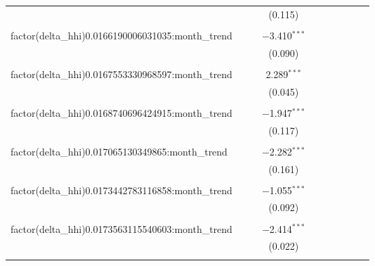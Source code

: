 \begin{table}[H]
{\begin{tabular}{@{\extracolsep{5pt}}lccccccccc}
   &  &  & (0.115) &  &  &  &  &  &  \\  

   & & & & & & & & & \\  

  factor(delta\_hhi)0.0166190006031035:month\_trend &  &  & $-$3.410$^{***}$ &  &  &  &  &  &  \\  

   &  &  & (0.090) &  &  &  &  &  &  \\  

   & & & & & & & & & \\  

  factor(delta\_hhi)0.0167553330968597:month\_trend &  &  & 2.289$^{***}$ &  &  &  &  &  &  \\  

   &  &  & (0.045) &  &  &  &  &  &  \\  

   & & & & & & & & & \\  

  factor(delta\_hhi)0.0168740696424915:month\_trend &  &  & $-$1.947$^{***}$ &  &  &  &  &  &  \\  

   &  &  & (0.117) &  &  &  &  &  &  \\  

   & & & & & & & & & \\  

  factor(delta\_hhi)0.017065130349865:month\_trend &  &  & $-$2.282$^{***}$ &  &  &  &  &  &  \\  

   &  &  & (0.161) &  &  &  &  &  &  \\  

   & & & & & & & & & \\  

  factor(delta\_hhi)0.0173442783116858:month\_trend &  &  & $-$1.055$^{***}$ &  &  &  &  &  &  \\  

   &  &  & (0.092) &  &  &  &  &  &  \\  

   & & & & & & & & & \\  

  factor(delta\_hhi)0.0173563115540603:month\_trend &  &  & $-$2.414$^{***}$ &  &  &  &  &  &  \\  

   &  &  & (0.022) &  &  &  &  &  &  \\  

   & & & & & & & & & \\  


\end{tabular}}
\end{table}
